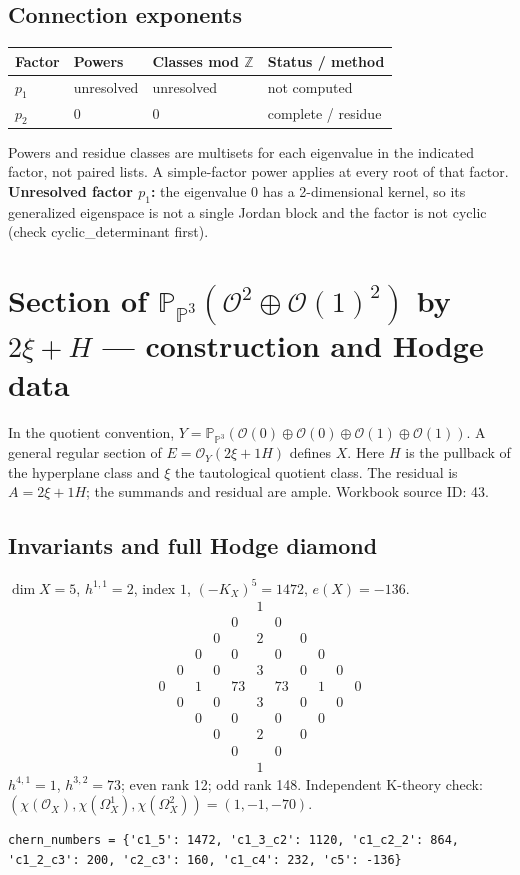 \documentclass[10pt,a4paper]{article}
\begin{document}
\subsection*{Connection exponents}
\begin{center}\begin{tabular}{llll}\toprule Factor & Powers & Classes mod $\mathbb Z$ & Status / method\\\midrule
$p_{1}$ & unresolved & unresolved & not computed\\
$p_{2}$ & $0$ & $0$ & complete / residue\\
\bottomrule\end{tabular}\end{center}
Powers and residue classes are multisets for each eigenvalue in the indicated factor, not paired lists. A simple-factor power applies at every root of that factor.
\textbf{Unresolved factor $p_{1}$:} the eigenvalue 0 has a 2-dimensional kernel, so its generalized eigenspace is not a single Jordan block and the factor is not cyclic (check cyclic\_determinant first).
\clearpage\section*{Section of $\mathbb P_{\mathbb P^{3}}(\mathcal O^{2}\oplus \mathcal O(1)^{2})$ by $2\xi +H$ --- construction and Hodge data}\label{entry:PB5-043}
In the quotient convention, $Y=\mathbb P_{\mathbb P^{3}}(\mathcal O(0)\oplus\mathcal O(0)\oplus\mathcal O(1)\oplus\mathcal O(1))$.
A general regular section of $E=\mathcal O_Y(2\xi+1H)$ defines $X$.
Here $H$ is the pullback of the hyperplane class and $\xi$ the tautological quotient class. The residual is $A=2\xi+1H$; the summands and residual are ample.
Workbook source ID: 43.
\subsection*{Invariants and full Hodge diamond}
$\dim X=5$, $h^{1,1}=2$, index $1$, $(-K_X)^5=1472$, $e(X)=-136$.
\[\begin{array}{ccccccccccc}&&&&&1&&&&&\\&&&&0&&0&&&&\\&&&0&&2&&0&&&\\&&0&&0&&0&&0&&\\&0&&0&&3&&0&&0&\\0&&1&&73&&73&&1&&0\\&0&&0&&3&&0&&0&\\&&0&&0&&0&&0&&\\&&&0&&2&&0&&&\\&&&&0&&0&&&&\\&&&&&1&&&&&\end{array}\]
$h^{4,1}=1$, $h^{3,2}=73$; even rank 12; odd rank 148.
Independent K-theory check: $(\chi(\mathcal O_X),\chi(\Omega_X^1),\chi(\Omega_X^2))=(1, -1, -70)$.
\begin{lstlisting}
chern_numbers = {'c1_5': 1472, 'c1_3_c2': 1120, 'c1_c2_2': 864, 'c1_2_c3': 200, 'c2_c3': 160, 'c1_c4': 232, 'c5': -136}
\end{lstlisting}
\end{document}
